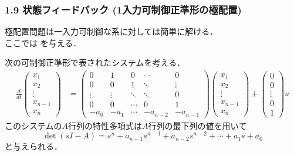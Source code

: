 \begin{frame}[t]
\frametitle{1.9 状態フィードバック (1入力可制御正準形の極配置)}
極配置問題は一入力可制御な系に対しては簡単に解ける．\\
ここでは
を与える．

次の可制御正準形で表されたシステムを考える．
\begin{align}
 \frac{d}{dt}
  \left(\begin{array}{c}
         x_1 \\
   x_2 \\
   \vdots \\
   x_{n-1} \\
   x_n
  \end{array}\right)
  &=
  \left(\begin{array}{ccccc}
     0      & 1      & 0      & \cdots & 0 \\
   0      & 0      & 1      & \ddots & \vdots \\
   \vdots & \vdots & \ddots & \ddots & 0 \\
   0      & 0      & \cdots & 0      & 1 \\
   -a_0   & -a_1   & \cdots & -a_{n-2} & -a_{n-1}
  \end{array}\right)
  \left(\begin{array}{c}
   x_1 \\
   x_2 \\
   \vdots \\
   x_{n-1} \\
   x_n
  \end{array}\right)
  +
  \left(\begin{array}{c}
         0 \\
   0 \\
   \vdots \\
   0 \\
   1
  \end{array}\right)
  u
\end{align}
このシステムの$A$行列の特性多項式は$A$行列の最下列の値を用いて
\begin{equation}
 \det (sI-{A}) = s^n + a_{n-1} s^{n-1}
  + a_{n-2} s^{n-2} + \cdots + a_1 s + a_0
\end{equation}
と与えられる．

\end{frame}


